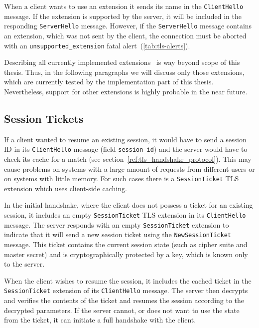     When a client wants to use an extension
    it sends its name in the \texttt{ClientHello} message. If the
    extension is supported by the server, it will be included in the responding
    \texttt{ServerHello} message. However, if the \texttt{ServerHello} message
    contains an extension, which was not sent by the client, the connection
    must be aborted with an \texttt{unsupported\_extension} fatal
    alert~(\ref{tab:tls-alerts}).~\cite{rfc3546}~\cite{rfc4366}

    Describing all currently implemented extensions~\cite{rfc6066} is
    way beyond scope of this thesis.
    Thus, in the following paragraphs we will discuss only those extensions,
    which are currently tested by the implementation part of this thesis.
    Nevertheless, support for other extensions is highly probable in
    the near future.

\subsection{Session Tickets} \label{ref:sessionticket-ext}
    If a client wanted to resume an existing session, it would have to
    send a session ID in its \texttt{ClientHello} message (field \texttt{session\_id})
    and the server would have to check its cache for a match (see
    section~\ref{ref:tls_handshake_protocol}). This may cause problems on systems
    with a large amount of requests from different users or on systems with
    little memory. For such cases there is a \texttt{SessionTicket} TLS extension which uses
    client-side caching.~\cite{rfc5077}

    In the initial handshake, where the client does not possess a ticket for an existing
    session, it includes an empty \texttt{SessionTicket} TLS extension in
    its \texttt{ClientHello} message. The server responds with an empty
    \texttt{SessionTicket} extension to indicate that it will send a new session
    ticket using the \texttt{NewSessionTicket} message. This ticket contains
    the current session state (such as cipher suite and master secret) and is
    cryptographically protected by a key, which is known only to the server.

    When the client wishes to resume the session, it includes the cached ticket
    in the \texttt{SessionTicket} extension of its \texttt{ClientHello} message.
    The server then decrypts and verifies the contents of the ticket and resumes
    the session according to the decrypted parameters. If the server cannot,
    or does not want to use the state from the ticket, it can initiate
    a full handshake with the client.

